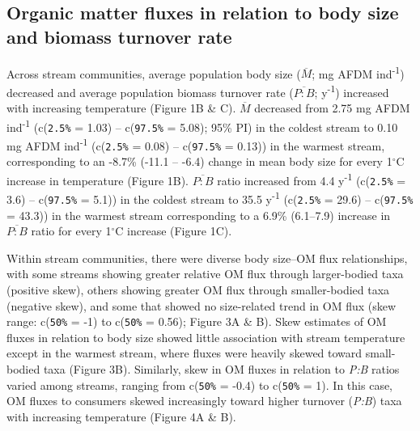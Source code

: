 \documentclass[
]{article}
\numberwithin{equation}
\begin{document}
\hypertarget{organic-matter-fluxes-in-relation-to-body-size-and-biomass-turnover-rate}{%
\subsection{Organic matter fluxes in relation to body size and biomass
turnover
rate}\label{organic-matter-fluxes-in-relation-to-body-size-and-biomass-turnover-rate}}

Across stream communities, average population body size
(\(\overline{M}\); mg AFDM ind\textsuperscript{-1}) decreased and
average population biomass turnover rate (\(\overline{P:B}\);
y\textsuperscript{-1}) increased with increasing temperature (Figure 1B
\& C). \(\overline{M}\) decreased from 2.75 mg AFDM
ind\textsuperscript{-1} (c(\texttt{2.5\%} = 1.03) -- c(\texttt{97.5\%} =
5.08); 95\% PI) in the coldest stream to 0.10 mg AFDM
ind\textsuperscript{-1} (c(\texttt{2.5\%} = 0.08) -- c(\texttt{97.5\%} =
0.13)) in the warmest stream, corresponding to an -8.7\% (-11.1 -- -6.4)
change in mean body size for every 1\(^\circ\)C increase in temperature
(Figure 1B). \(\overline{P:B}\) ratio increased from 4.4
y\textsuperscript{-1} (c(\texttt{2.5\%} = 3.6) -- c(\texttt{97.5\%} =
5.1)) in the coldest stream to 35.5 y\textsuperscript{-1}
(c(\texttt{2.5\%} = 29.6) -- c(\texttt{97.5\%} = 43.3)) in the warmest
stream corresponding to a 6.9\% (6.1--7.9) increase in
\(\overline{P:B}\) ratio for every 1\(^\circ\)C increase (Figure 1C).

Within stream communities, there were diverse body size--OM flux
relationships, with some streams showing greater relative OM flux
through larger-bodied taxa (positive skew), others showing greater OM
flux through smaller-bodied taxa (negative skew), and some that showed
no size-related trend in OM flux (skew range: c(\texttt{50\%} = -1) to
c(\texttt{50\%} = 0.56); Figure 3A \& B). Skew estimates of OM fluxes in
relation to body size showed little association with stream temperature
except in the warmest stream, where fluxes were heavily skewed toward
small-bodied taxa (Figure 3B). Similarly, skew in OM fluxes in relation
to \emph{P:B} ratios varied among streams, ranging from c(\texttt{50\%}
= -0.4) to c(\texttt{50\%} = 1). In this case, OM fluxes to consumers
skewed increasingly toward higher turnover (\emph{P:B}) taxa with
increasing temperature (Figure 4A \& B).
\end{document}
